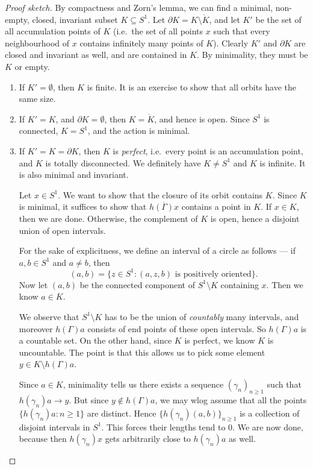 \documentclass[a4paper]{article}
\begin{document}
\begin{proof}[Proof sketch]
  By compactness and Zorn's lemma, we can find a minimal, non-empty, closed, invariant subset $K \subseteq S^1$. Let $\partial K = K \setminus \mathring{K}$, and let $K'$ be the set of all accumulation points of $K$ (i.e.\ the set of all points $x$ such that every neighbourhood of $x$ contains infinitely many points of $K$). Clearly $K'$ and $\partial K$ are closed and invariant as well, and are contained in $K$. By minimality, they must be $K$ or empty.

  \begin{enumerate}
    \item If $K' = \emptyset$, then $K$ is finite. It is an exercise to show that all orbits have the same size.
    \item If $K' = K$, and $\partial K = \emptyset$, then $K = \mathring{K}$, and hence is open. Since $S^1$ is connected, $K = S^1$, and the action is minimal.
    \item If $K' = K = \partial K$, then $K$ is \emph{perfect}, i.e.\ every point is an accumulation point, and $K$ is totally disconnected. We definitely have $K \not= S^1$ and $K$ is infinite. It is also minimal and invariant.

      Let $x \in S^1$. We want to show that the closure of its orbit contains $K$. Since $K$ is minimal, it suffices to show that $\overline{h(\Gamma)x}$ contains a point in $K$. If $x \in K$, then we are done. Otherwise, the complement of $K$ is open, hence a disjoint union of open intervals.

       For the sake of explicitness, we define an interval of a circle as follows --- if $a, b \in S^1$ and $a \not= b$, then 
      \[
        (a, b) = \{z \in S^1: (a, z, b)\text{ is positively oriented}\}.
      \]
      Now let $(a, b)$ be the connected component of $S^1 \setminus K$ containing $x$. Then we know $a \in K$.

      We observe that $S^1 \setminus K$ has to be the union of \emph{countably} many intervals, and moreover $h(\Gamma) a$ consists of end points of these open intervals. So $h(\Gamma) a$ is a countable set. On the other hand, since $K$ is perfect, we know $K$ is uncountable. The point is that this allows us to pick some element $y \in K \setminus h(\Gamma) a$.

      Since $a \in K$, minimality tells us there exists a sequence $(\gamma_n)_{n \geq 1}$ such that $h(\gamma_n) a \to y$. But since $y \not \in h(\Gamma) a$, we may wlog assume that all the points $\{h(\gamma_n)a : n \geq 1\}$ are distinct. Hence $\{h(\gamma_n)(a, b) \}_{n \geq 1}$ is a collection of disjoint intervals in $S^1$. This forces their lengths tend to $0$. We are now done, because then $h(\gamma_n) x$ gets arbitrarily close to $h(\gamma_n) a$ as well.\qedhere
  \end{enumerate}
\end{proof}
\end{document}
